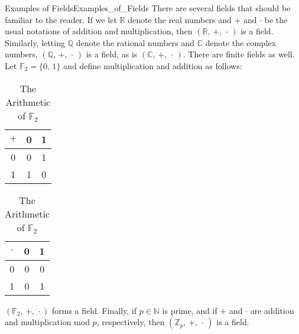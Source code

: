 \documentclass[crop=false,class=article]{standalone}                           %
\begin{document}
        \begin{lexample}{Examples of Fields}{Examples_of_Fields}
            There are several fields that should be familiar to the reader.
            If we let $\mathbb{R}$ denote the real numbers and $+$ and $\cdot$
            be the usual notations of addition and multiplication, then
            $(\mathbb{R},\,+,\,\cdot\,)$ is a field. Similarly, letting
            $\mathbb{Q}$ denote the rational numbers and $\mathbb{C}$ denote
            the complex numbers, $(\mathbb{Q},\,+,\,\cdot\,)$ is a field, as
            is $(\mathbb{C},\,+,\,\cdot\,)$. There are finite fields as well.
            Let $\mathbb{F}_{2}=\{0,\,1\}$ and define multiplication and
            addition as follows:
            \par\hfill\par
            \begin{table}[H]
                \centering
                \captionsetup{type=table}
                \parbox{.45\linewidth}{%
                    \centering
                    \begin{tabular}{c|cc}
                        $+$&0&1\\
                        \hline
                        0&0&1\\
                        1&1&0
                    \end{tabular}
                }
                \parbox{.45\linewidth}{%
                    \centering
                    \begin{tabular}{c|cc}
                        $\cdot$&0&1\\
                        \hline
                        0&0&0\\
                        1&0&1
                    \end{tabular}
                }
                \caption{The Arithmetic of $\mathbb{F}_{2}$}
            \end{table}
            $(\mathbb{F}_{2},\,+,\,\cdot)$ forms a field. Finally, if
            $p\in\mathbb{N}$ is prime, and if $+$ and $\cdot$ are addition
            and multiplication mod $p$, respectively, then
            $(\mathbb{Z}_{p},\,+,\,\cdot\,)$ is a field.
        \end{lexample}
\end{document}
